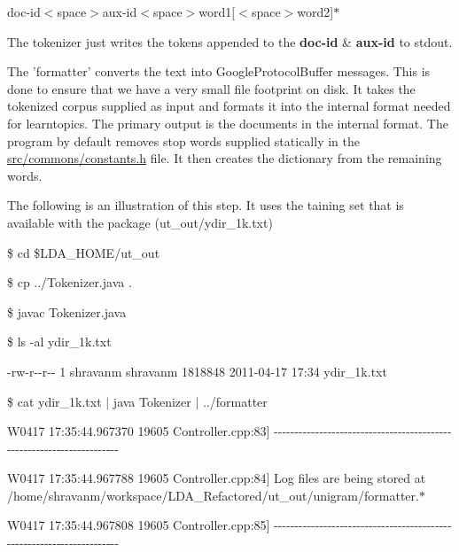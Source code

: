doc-\/id$<$space$>$aux-\/id$<$space$>$word1\mbox{[}$<$space$>$word2\mbox{]}$\ast$ 

The tokenizer just writes the tokens appended to the {\bfseries doc-\/id} \& {\bfseries aux-\/id} to stdout. 

The 'formatter' converts the text into GoogleProtocolBuffer messages. This is done to ensure that we have a very small file footprint on disk. It takes the tokenized corpus supplied as input and formats it into the internal format needed for learntopics. The primary output is the documents in the internal format. The program by default removes stop words supplied statically in the \hyperlink{constants_8h}{src/commons/constants.h} file. It then creates the dictionary from the remaining words. 

The following is an illustration of this step. It uses the taining set that is available with the package (ut\_\-out/ydir\_\-1k.txt) 

\par
  {\ttfamily  }

{\ttfamily \$ cd \$LDA\_\-HOME/ut\_\-out }

{\ttfamily \$ cp ../Tokenizer.java . }

{\ttfamily \$ javac Tokenizer.java }

{\ttfamily \$ ls -\/al ydir\_\-1k.txt }

{\ttfamily -\/rw-\/r-\/-\/r-\/-\/ 1 shravanm shravanm 1818848 2011-\/04-\/17 17:34 ydir\_\-1k.txt  }

{\ttfamily \$ cat ydir\_\-1k.txt $|$ java Tokenizer $|$ ../formatter }

{\ttfamily W0417 17:35:44.967370 19605 Controller.cpp:83\mbox{]} -\/-\/-\/-\/-\/-\/-\/-\/-\/-\/-\/-\/-\/-\/-\/-\/-\/-\/-\/-\/-\/-\/-\/-\/-\/-\/-\/-\/-\/-\/-\/-\/-\/-\/-\/-\/-\/-\/-\/-\/-\/-\/-\/-\/-\/-\/-\/-\/-\/-\/-\/-\/-\/-\/-\/-\/-\/-\/-\/-\/-\/-\/-\/-\/-\/-\/-\/-\/-\/-\/}

{\ttfamily   }

{\ttfamily W0417 17:35:44.967788 19605 Controller.cpp:84\mbox{]} Log files are being stored at /home/shravanm/workspace/LDA\_\-Refactored/ut\_\-out/unigram/formatter.$\ast$}

{\ttfamily   }

{\ttfamily W0417 17:35:44.967808 19605 Controller.cpp:85\mbox{]} -\/-\/-\/-\/-\/-\/-\/-\/-\/-\/-\/-\/-\/-\/-\/-\/-\/-\/-\/-\/-\/-\/-\/-\/-\/-\/-\/-\/-\/-\/-\/-\/-\/-\/-\/-\/-\/-\/-\/-\/-\/-\/-\/-\/-\/-\/-\/-\/-\/-\/-\/-\/-\/-\/-\/-\/-\/-\/-\/-\/-\/-\/-\/-\/-\/-\/-\/-\/-\/-\/}

